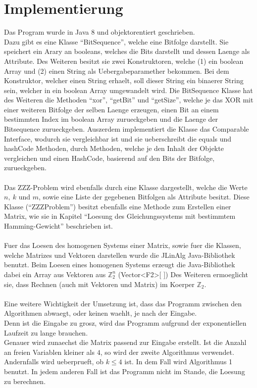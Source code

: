\documentclass[a4paper,10pt,ngerman]{scrartcl}
\begin{document}
{\section{Implementierung}
Das Program wurde in Java 8 und objektorentiert geschrieben.
\\ Dazu gibt es eine Klasse "`BitSequence"', welche eine Bitfolge darstellt. Sie speichert ein Arary an booleans, welches die Bits darstellt und dessen Laenge als Attribute. 
Des Weiteren besitzt sie zwei Konstruktoren, welche (1) ein boolean Array und (2) einen String als Uebergabeparamether bekommen. Bei dem Konstruktor, welcher einen String erhaelt, soll dieser String ein binaerer String sein, welcher in ein boolean Array umgewandelt wird.
Die BitSequence Klasse hat des Weiteren die Methoden "`xor"', "`getBit"' und "`getSize"', welche je das XOR mit einer weiteren Bitfolge der selben Laenge erzeugen, einen Bit an einem bestimmten Index im boolean Array zurueckgeben und die Laenge der Bitsequence zurueckgeben. Auszerdem implementiert die Klasse das Comparable Interface, wodurch sie vergleichbar ist und sie ueberschreibt die equals und hashCode Methoden, durch Methoden, welche je den Inhalt der Objekte vergleichen und einen HashCode, basierend auf den Bits der Bitfolge, zurueckgeben.
\\\\
Das ZZZ-Problem wird ebenfalls durch eine Klasse dargestellt, welche die Werte $n, \ k$ und $m$, sowie eine Liste der gegebenen Bitfolgen als Attribute besitzt. Diese Klasse ("`ZZZProblem"') besitzt ebenfalls eine Methode zum Erstellen einer Matrix, wie sie in Kapitel "`Loesung des Gleichungssystems mit bestimmtem Hamming-Gewicht"' beschrieben ist.
\\\\
Fuer das Loesen des homogenen Systems einer Matrix, sowie fuer die Klassen, welche Matrizes und Vektoren darstellen wurde die JLinAlg Java-Bibliothek benutzt. 
Beim Loesen eines homogenen Systems erzeugt die Java-Bibliothek dabei ein Array aus Vektoren aus \(\mathbb{Z}_{2}^n\) (Vector<F2>[ ])
Des Weiteren ermoeglicht sie, dass Rechnen (auch mit Vektoren und Matrix) im Koerper \(\mathbb{Z}_{2}\). 
\\\\
Eine weitere Wichtigkeit der Umsetzung ist, dass das Programm zwischen den Algorithmen abwaegt, oder keinen waehlt, je nach der Eingabe.\\
Denn ist die Eingabe zu grosz, wird das Programm aufgrund der exponentiellen Laufzeit zu lange brauchen. \\
Genauer wird zunaechst die Matrix passend zur Eingabe erstellt. Ist die Anzahl an freien Variablen kleiner als $4$, so wird der zweite Algorithmus verwendet. Andernfalls wird ueberprueft, ob $k \leq 4$ ist. In dem Fall wird Algorithmus 1 benutzt.
In jedem anderen Fall ist das Programm nicht im Stande, die Loesung zu berechnen.

}
\end{document}
